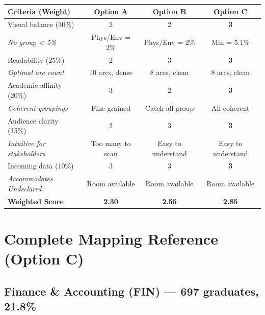 \documentclass[
  11pt,
  letterpaper,
]{report}
\begin{document}
\renewcommand{\arraystretch}{1.3}
\begin{center}
\small
\begin{tabular}{p{4cm}ccc}
\toprule
\textbf{Criteria (Weight)} & \textbf{Option A} & \textbf{Option B} & \textbf{Option C} \\
\midrule
Visual balance (30\%) & 2 & 2 & \textbf{3} \\
{\scriptsize \textit{No group < 5\%}} & {\scriptsize Phys/Env = 2\%} & {\scriptsize Phys/Env = 2\%} & {\scriptsize Min = 5.1\%} \\[4pt]
Readability (25\%) & 2 & 3 & \textbf{3} \\
{\scriptsize \textit{Optimal arc count}} & {\scriptsize 10 arcs, dense} & {\scriptsize 8 arcs, clean} & {\scriptsize 8 arcs, clean} \\[4pt]
Academic affinity (20\%) & 3 & 2 & \textbf{3} \\
{\scriptsize \textit{Coherent groupings}} & {\scriptsize Fine-grained} & {\scriptsize Catch-all group} & {\scriptsize All coherent} \\[4pt]
Audience clarity (15\%) & 2 & 3 & \textbf{3} \\
{\scriptsize \textit{Intuitive for stakeholders}} & {\scriptsize Too many to scan} & {\scriptsize Easy to understand} & {\scriptsize Easy to understand} \\[4pt]
Incoming data (10\%) & 3 & 3 & \textbf{3} \\
{\scriptsize \textit{Accommodates Undeclared}} & {\scriptsize Room available} & {\scriptsize Room available} & {\scriptsize Room available} \\
\midrule
\textbf{Weighted Score} & \textbf{2.30} & \textbf{2.55} & \textbf{2.85} \\
\bottomrule
\end{tabular}
\end{center}

\vspace{0.5cm}
\begin{center}
\end{center}

\chapter{Complete Mapping Reference (Option C)}\label{sec-mapping}

\section{Finance \& Accounting (FIN) --- 697 graduates,
21.8\%}\label{finance-accounting-fin-697-graduates-21.8}
\end{document}
